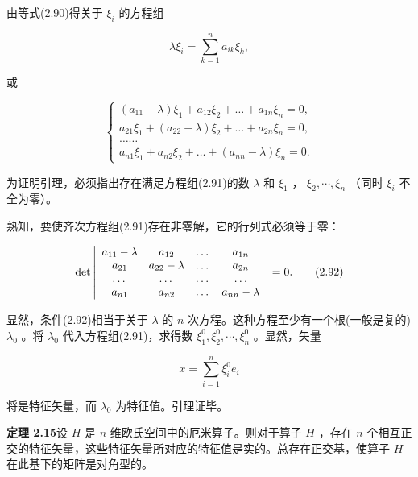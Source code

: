 由等式(2.90)得关于 $\xi_{i}$ 的方程组

\begin{equation*}
\lambda \xi_ {i} = \sum_ {k = 1} ^ {n} a _ {i k} \xi_ {k},
\end{equation*}

或

\begin{equation*}
\left\{ \begin{array}{l} (a _ {1 1} - \lambda) \xi_ {1} + a _ {1 2} \xi_ {2} + \dots + a _ {1 n} \xi_ {n} = 0, \\ a _ {2 1} \xi_ {1} + (a _ {2 2} - \lambda) \xi_ {2} + \dots + a _ {2 n} \xi_ {n} = 0, \\ \dots\dots\\ a _ {n 1} \xi_ {1} + a _ {n 2} \xi_ {2} + \dots + (a _ {n n} - \lambda) \xi_ {n} = 0. \end{array} \right.\tag{2.91}
\end{equation*}

为证明引理，必须指出存在满足方程组(2.91)的数 $\lambda$ 和 $\xi_{1}$ ， $\xi_{2},\cdots,\xi_{n}$ （同时 $\xi_{i}$ 不全为零）。

熟知，要使齐次方程组(2.91)存在非零解，它的行列式必须等于零：

\begin{equation*}
\det \left| \begin{array}{c c c c} a _ {1 1} - \lambda & a _ {1 2} & \dots & a _ {1 n} \\ a _ {2 1} & a _ {2 2} - \lambda & \dots & a _ {2 n} \\ \dots & \dots & \dots & \dots \\ a _ {n 1} & a _ {n 2} & \dots & a _ {n n} - \lambda \end{array} \right| = 0.\tag{2.92}
\end{equation*}

显然，条件(2.92)相当于关于 $\lambda$ 的 $n$ 次方程。这种方程至少有一个根(一般是复的) $\lambda_{0}$ 。将 $\lambda_{0}$ 代入方程组(2.91)，求得数 $\xi_{1}^{0}, \xi_{2}^{0}, \cdots, \xi_{n}^{0}$ 。显然，矢量

\begin{equation*}
x = \sum_ {i = 1} ^ {n} \xi_ {i} ^ {0} e _ {i}
\end{equation*}

将是特征矢量，而 $\lambda_{0}$ 为特征值。引理证毕。

\textbf{定理 2.15}\quad 设 $H$ 是 $n$ 维欧氏空间中的厄米算子。则对于算子 $H$ ，存在 $n$ 个相互正交的特征矢量，这些特征矢量所对应的特征值是实的。总存在正交基，使算子 $H$ 在此基下的矩阵是对角型的。

